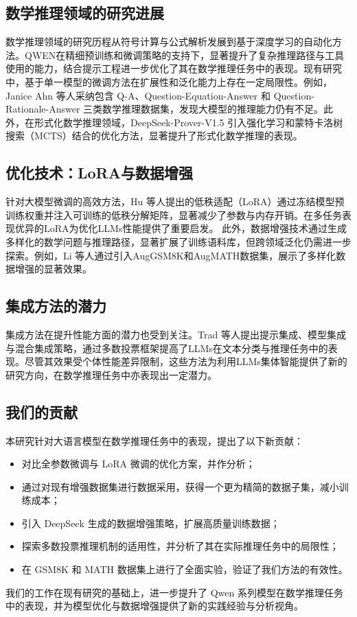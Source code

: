 \documentclass{article}
\begin{document}
\subsection{数学推理领域的研究进展}
数学推理领域的研究历程从符号计算与公式解析发展到基于深度学习的自动化方法。QWEN在精细预训练和微调策略的支持下，显著提升了复杂推理路径与工具使用的能力，结合提示工程进一步优化了其在数学推理任务中的表现。现有研究中，基于单一模型的微调方法在扩展性和泛化能力上存在一定局限性。例如，Janice Ahn 等人采纳包含 Q-A、Question-Equation-Answer 和 Question-Rationale-Answer 三类数学推理数据集，发现大模型的推理能力仍有不足\cite{ahn2024mathreasoning}。此外，在形式化数学推理领域，DeepSeek-Prover-V1.5 引入强化学习和蒙特卡洛树搜索（MCTS）结合的优化方法，显著提升了形式化数学推理的表现\cite{xin2024deepseekprover}。

\subsection{优化技术：LoRA与数据增强}
针对大模型微调的高效方法，Hu 等人提出的低秩适配（LoRA）通过冻结模型预训练权重并注入可训练的低秩分解矩阵，显著减少了参数与内存开销\cite{hu2021lora}。在多任务表现优异的LoRA为优化LLMs性能提供了重要启发。  
此外，数据增强技术通过生成多样化的数学问题与推理路径，显著扩展了训练语料库，但跨领域泛化仍需进一步探索。例如，Li 等人通过引入AugGSM8K和AugMATH数据集，展示了多样化数据增强的显著效果\cite{li2024mugglemath1}\cite{li2024mugglemath2}\cite{yuan2023scaling}。

\subsection{集成方法的潜力}
集成方法在提升性能方面的潜力也受到关注。Trad 等人提出提示集成、模型集成与混合集成策略，通过多数投票框架提高了LLMs在文本分类与推理任务中的表现\cite{trad2024ensemble}。尽管其效果受个体性能差异限制，这些方法为利用LLMs集体智能提供了新的研究方向，在数学推理任务中亦表现出一定潜力。
\subsection{我们的贡献}
本研究针对大语言模型在数学推理任务中的表现，提出了以下新贡献：
\begin{itemize}
    \item 对比全参数微调与 LoRA 微调的优化方案，并作分析；
    \item 通过对现有增强数据集进行数据采用，获得一个更为精简的数据子集，减小训练成本；
    \item 引入 DeepSeek 生成的数据增强策略，扩展高质量训练数据；
    \item 探索多数投票推理机制的适用性，并分析了其在实际推理任务中的局限性；
    \item 在 GSM8K 和 MATH 数据集上进行了全面实验，验证了我们方法的有效性。
\end{itemize}
我们的工作在现有研究的基础上，进一步提升了 Qwen 系列模型在数学推理任务中的表现，并为模型优化与数据增强提供了新的实践经验与分析视角。
\end{document}
